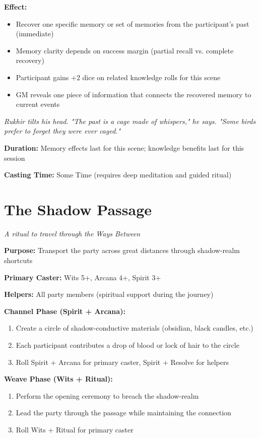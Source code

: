 \documentclass[12pt,twoside]{book}
\newcommand{\shadow}[1]{\textit{#1}}
\begin{document}
\textbf{Effect:}
\begin{itemize}
\item Recover one specific memory or set of memories from the participant's past (immediate)
\item Memory clarity depends on success margin (partial recall vs. complete recovery)
\item Participant gains +2 dice on related knowledge rolls for this scene
\item GM reveals one piece of information that connects the recovered memory to current events
\end{itemize}

\shadow{Rukhir tilts his head. "The past is a cage made of whispers," he says. "Some birds prefer to forget they were ever caged."}

\textbf{Duration:} Memory effects last for this scene; knowledge benefits last for this session

\textbf{Casting Time:} Some Time (requires deep meditation and guided ritual)

\section*{The Shadow Passage}
\textit{A ritual to travel through the Ways Between}

\textbf{Purpose:} Transport the party across great distances through shadow-realm shortcuts

\textbf{Primary Caster:} Wits 5+, Arcana 4+, Spirit 3+

\textbf{Helpers:} All party members (spiritual support during the journey)

\textbf{Channel Phase (Spirit + Arcana):}
\begin{enumerate}
\item Create a circle of shadow-conductive materials (obsidian, black candles, etc.)
\item Each participant contributes a drop of blood or lock of hair to the circle
\item Roll Spirit + Arcana for primary caster, Spirit + Resolve for helpers
\end{enumerate}

\textbf{Weave Phase (Wits + Ritual):}
\begin{enumerate}
\item Perform the opening ceremony to breach the shadow-realm
\item Lead the party through the passage while maintaining the connection
\item Roll Wits + Ritual for primary caster
\end{enumerate}
\end{document}
